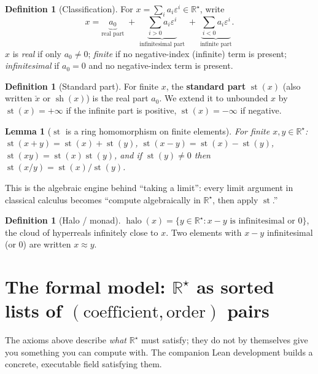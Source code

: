 \documentclass[11pt]{article}
\newtheorem{lemma}[theorem]{Lemma}
\theoremstyle{definition}
\newtheorem{definition}[theorem]{Definition}
\theoremstyle{remark}
\newcommand{\Rstar}{\mathbb{R}^{\star}}
\newcommand{\eps}{\varepsilon}
\newcommand{\st}{\operatorname{st}}
\newcommand{\halo}{\operatorname{halo}}
\begin{document}
\begin{definition}[Classification]
For $x = \sum_i a_i \eps^i \in \Rstar$, write
\[
x = \underbrace{a_0}_{\text{real part}} \;+\; \underbrace{\textstyle\sum_{i>0} a_i\eps^i}_{\text{infinitesimal part}} \;+\; \underbrace{\textstyle\sum_{i<0} a_i\eps^i}_{\text{infinite part}}.
\]
$x$ is \emph{real} if only $a_0 \ne 0$; \emph{finite} if no negative-index
(infinite) term is present; \emph{infinitesimal} if $a_0=0$ and no
negative-index term is present.
\end{definition}

\begin{definition}[Standard part]
For finite $x$, the \textbf{standard part} $\st(x)$ (also written
$\check x$ or $\operatorname{sh}(x)$) is the real part $a_0$. We extend it
to unbounded $x$ by $\st(x)=+\infty$ if the infinite part is positive,
$\st(x)=-\infty$ if negative.
\end{definition}

\begin{lemma}[$\st$ is a ring homomorphism on finite elements]\label{lem:st-hom}
For finite $x,y \in \Rstar$:
$\st(x+y)=\st(x)+\st(y)$, $\st(x-y)=\st(x)-\st(y)$, $\st(xy)=\st(x)\st(y)$,
and if $\st(y)\ne 0$ then $\st(x/y) = \st(x)/\st(y)$.
\end{lemma}
This is the algebraic engine behind ``taking a limit'': every limit
argument in classical calculus becomes ``compute algebraically in
$\Rstar$, then apply $\st$.''

\begin{definition}[Halo / monad]
$\halo(x) = \{y \in \Rstar : x - y \text{ is infinitesimal or } 0\}$, the
cloud of hyperreals infinitely close to $x$. Two elements with $x-y$
infinitesimal (or $0$) are written $x \approx y$.
\end{definition}

\section{The formal model: $\Rstar$ as sorted lists of $(\text{coefficient}, \text{order})$ pairs}\label{sec:model}

The axioms above describe \emph{what} $\Rstar$ must satisfy; they do not
by themselves give you something you can compute with. The companion Lean
development builds a concrete, executable field satisfying them.
\end{document}
